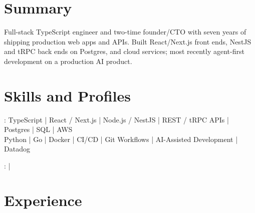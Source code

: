 \documentclass[print]{jack-resume}
\begin{document}
\pagecolor{darkmodeBackground}


\begin{minipage}[t][1cm][t]{.03\textwidth}
    \hfill
\end{minipage}

\section{Summary}
Full-stack TypeScript engineer and two-time founder/CTO with seven years of shipping production web apps and APIs. Built React/Next.js front ends, NestJS and tRPC back ends on Postgres, and cloud services; most recently agent-first development on a production AI product.
\sectionsep

\section{Skills and Profiles}
:
TypeScript \hfill | \hfill
React / Next.js \hfill | \hfill
Node.js / NestJS \hfill | \hfill
REST / tRPC APIs \hfill | \hfill
Postgres \hfill | \hfill
SQL \hfill | \hfill
AWS \\
\hspace{1.0cm} Python \hfill | \hfill
Go \hfill | \hfill
Docker \hfill | \hfill
CI/CD \hfill | \hfill
Git Workflows \hfill | \hfill
AI-Assisted Development \hfill | \hfill
Datadog \\

\raggedright{
    :
      \href{https://www.linkedin.com/in/jack-sturtevant/}{ \ExternalLink} |
     \href{https://github.com/jacksturt}{ \ExternalLink}}

\section{Experience}
\end{document}

